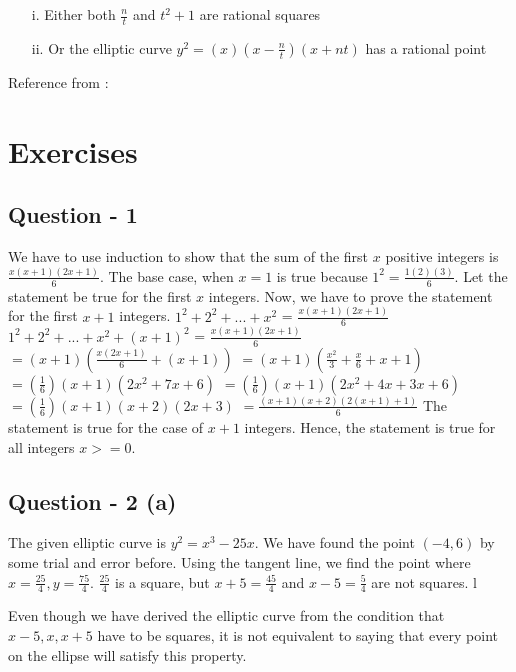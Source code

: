 \documentclass[12pt]{article}
\begin{document}
\begin{itemize}
\item[i.] Either both $\frac{n}{t}$ and $t^2 + 1$ are rational squares
\item[ii.]  Or the elliptic curve $y^2 = (x)(x - \frac{n}{t})(x + nt)$ has a rational point
\end{itemize}

\vspace{5mm}
Reference from : \href{https://www.math.hkust.edu.hk/~yangwang/Course/2016FSMath4999}

\clearpage

\section{Exercises}

\subsection{Question - 1}

We have to use induction to show that the sum of the first $x$ positive integers is $\frac{x(x+1)(2x+1)}{6}$.
\newline
The base case, when $x = 1$ is true because $1^2 = \frac{1(2)(3)}{6}$. 
Let the statement be true for the first $x$ integers. Now, we have to prove the statement for the first $x+1$ integers. 
$1^2 + 2^2 + ... + x^2$ = $\frac{x(x+1)(2x+1)}{6}$ \newline
$1^2 + 2^2 + ... + x^2 + (x+1)^2$ = $\frac{x(x+1)(2x+1)}{6}$\newline
$ = (x+1)(\frac{x(2x+1)}{6} + (x+1))$ \newline
$ = (x+1)(\frac{x^2}{3} + \frac{x}{6} + x + 1)$ \newline
$ = (\frac{1}{6})(x+1)(2x^2 + 7x + 6)$ \newline
$ = (\frac{1}{6})(x+1)(2x^2 + 4x + 3x + 6)$ \newline
$ = (\frac{1}{6})(x+1)(x+2)(2x+3)$ \newline
$ = \frac{(x+1)(x+2)(2(x+1) + 1)}{6}$ \newline
The statement is true for the case of $x+1$ integers. 
Hence, the statement is true for all integers $x>=0$. 

\subsection{Question - 2 (a)}

The given elliptic curve is $y^2 = x^3 - 25x$. We have found the point $(-4, 6)$ by some trial and error before. Using the tangent line, we find the point where 
$x = \frac{25}{4}, y = \frac{75}{4}$. 
\newline
\vspace{3mm}
$\frac{25}{4}$ is a square, but $ {x+5} = \frac{45}{4}$ and $ {x-5} = \frac{5}{4}$ are not squares. l

Even though we have derived the elliptic curve from the condition that $x-5, x, x+5$ have to be squares, it is not equivalent to saying that every point on the ellipse will satisfy this property. 
\end{document}
